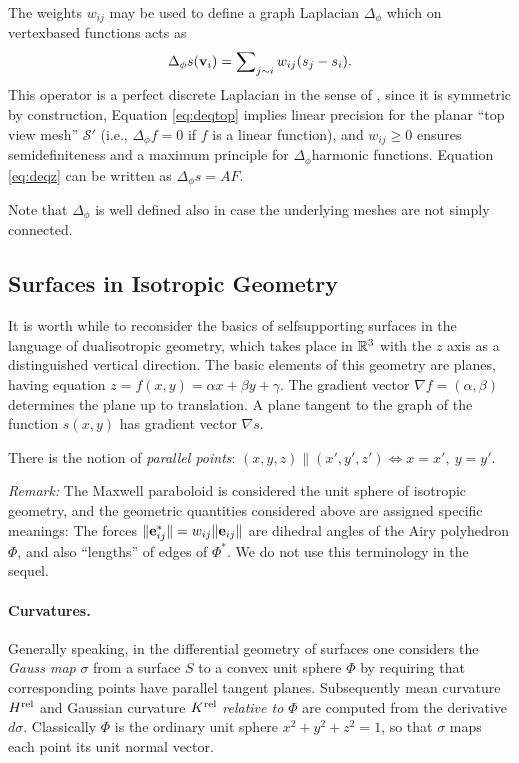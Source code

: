 \documentclass[review]{acmsiggraph}
\def\rel{{\mathord{{\rm rel}}}}
\def\SS{{\mathcal S}}
\begin{document}
The weights $w_{ij}$ may be used to define a graph Laplacian $\Delta_\phi$ 
which on vertex\dash based functions acts as
	\begin{align*}
	\Delta_{\phi} s({\mathbf v}_i)=\sum\nolimits_{j\sim i} w_{ij}(s_j-s_i).
	\end{align*}
 This operator is a perfect discrete Laplacian in the sense of 
\cite{wardetzky07}, since it is symmetric by construction, Equation 
\eqref{eq:deqtop} implies linear precision for the planar ``top view 
mesh'' $\SS'$ (i.e., $\Delta_\phi f=0$ if $f$ is a linear function), and 
$w_{ij}\ge 0$ ensures semidefiniteness and a maximum principle for 
$\Delta_\phi$\dash harmonic functions. Equation \eqref{eq:deqz} can be 
written as $\Delta_\phi s = AF$.

Note that $\Delta_\phi$ is well defined also in case the underlying meshes 
are not simply connected.

\subsection{Surfaces in Isotropic Geometry} \label{sec:smooth}

It is worth while to reconsider the basics of self\dash supporting surfaces 
in the language of dual\dash isotropic geometry, which takes place in 
${\mathbb R}^3$ with the $z$ axis as a distinguished vertical direction. The basic 
elements of this geometry are planes, having equation $z=f(x,y) = \alpha 
x+\beta y+\gamma$. The gradient vector $\nabla f = (\alpha,\beta)$ 
determines the plane up to translation. A plane tangent to the graph of 
the function $s(x,y)$ has gradient vector $\nabla s$.

There is the notion of {\em parallel points}:
	$
	(x,y,z) \parallel (x',y',z') \iff
	x=x',\ y=y'
	.$

{\it Remark:} The Maxwell paraboloid is considered the unit sphere of isotropic 
geometry, and the geometric quantities considered above are assigned
specific meanings: The forces $\|{\mathbf e}_{ij}^*\|=w_{ij}\|{\mathbf e}_{ij}\|$
are dihedral angles of the Airy polyhedron $\Phi$, and also ``lengths'' of
edges of $\Phi^*$. We do not use this terminology in the sequel.

\paragraph{Curvatures.}

Generally speaking, in the differential geometry of surfaces one considers 
the {\em Gauss map} $\sigma$ from a surface $S$ to a convex unit sphere 
$\Phi$ by requiring that corresponding points have parallel tangent 
planes.  Subsequently mean curvature $H^\rel$ and Gaussian curvature 
$K^\rel$ {\em relative to $\Phi$} are computed from the derivative 
$d\sigma$. Classically $\Phi$ is the ordinary unit sphere $x^2+y^2+z^2=1$, 
so that $\sigma$ maps each point its unit normal vector.
\end{document}

